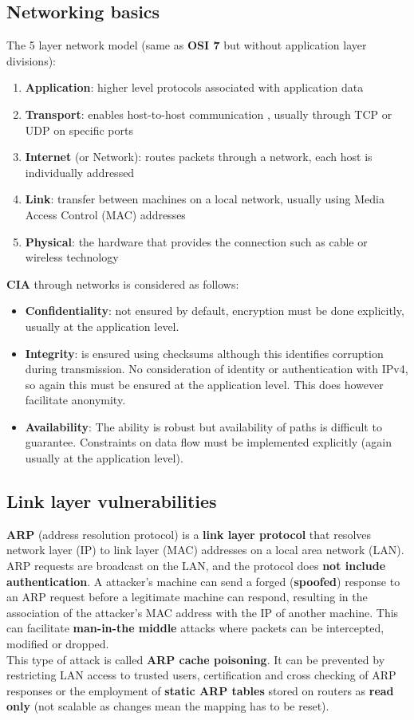 \documentclass{article}
\newcommand{\np}{\vspace{8pt} \\}
\begin{document}
\subsection{Networking basics}
The 5 layer network model (same as \textbf{OSI 7} but without application layer divisions):
\begin{enumerate}
	\item \textbf{Application}: higher level protocols associated with application data
	\item \textbf{Transport}: enables host-to-host communication , usually through TCP or UDP on specific ports
	\item \textbf{Internet} (or Network): routes packets through a network, each host is individually addressed
	\item \textbf{Link}: transfer between machines on a local network, usually using Media Access Control (MAC) addresses
	\item \textbf{Physical}: the hardware that provides the connection such as cable or wireless technology
\end{enumerate}
\textbf{CIA} through networks is considered as follows:
\begin{itemize}
	\item \textbf{Confidentiality}: not ensured by default, encryption must be done explicitly, usually at the application level.
	\item \textbf{Integrity}: is ensured using checksums although this identifies corruption during transmission. No consideration of identity or authentication with IPv4, so again this must be ensured at the application level. This does however facilitate anonymity.
	\item \textbf{Availability}: The ability is robust but availability of paths is difficult to guarantee. Constraints on data flow must be implemented explicitly (again usually at the application level).
\end{itemize}

\subsection{Link layer vulnerabilities}
\textbf{ARP} (address resolution protocol) is a \textbf{link layer protocol} that resolves network layer (IP) to link layer (MAC) addresses on a local area network (LAN). ARP requests are broadcast on the LAN, and the protocol does \textbf{not include authentication}. A attacker's machine can send a forged (\textbf{spoofed}) response to an ARP request before a legitimate machine can respond, resulting in the association of the attacker's MAC address with the IP of another machine. This can facilitate \textbf{man-in-the middle} attacks where packets can be intercepted, modified or dropped. \np
This type of attack is called \textbf{ARP cache poisoning}. It can be prevented by restricting LAN access to trusted users, certification and cross checking of ARP responses or the employment of \textbf{static ARP tables} stored on routers as \textbf{read only} (not scalable as changes mean the mapping has to be reset).
\end{document}
